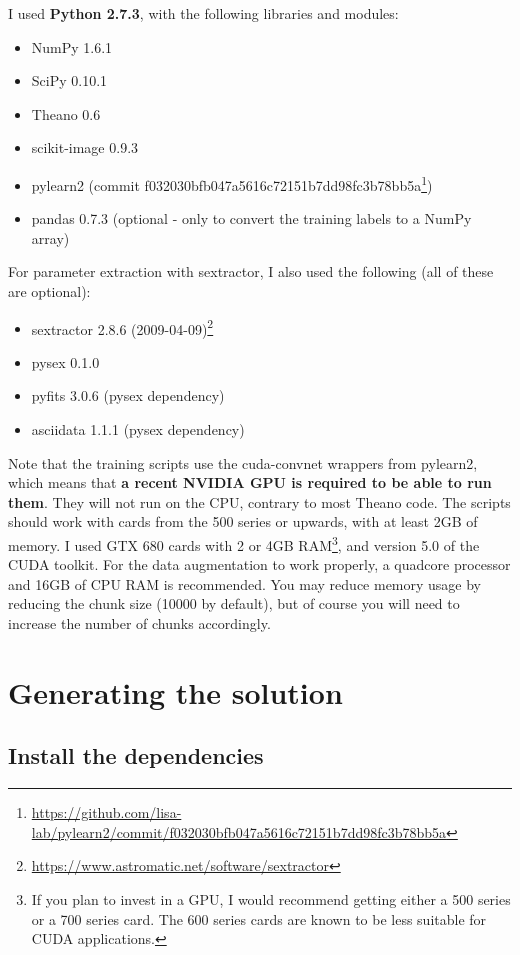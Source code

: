 \documentclass[a4paper,10pt]{article}
\begin{document}
I used \textbf{Python 2.7.3}, with the following libraries and modules:

\begin{itemize}
 \item NumPy 1.6.1
 \item SciPy 0.10.1
 \item Theano 0.6
 \item scikit-image 0.9.3
 \item pylearn2 (commit f032030bfb047a5616c72151b7dd98fc3b78bb5a\footnote{\url{https://github.com/lisa-lab/pylearn2/commit/f032030bfb047a5616c72151b7dd98fc3b78bb5a}})
 \item pandas 0.7.3 (optional - only to convert the training labels to a NumPy array)
\end{itemize}

For parameter extraction with sextractor, I also used the following (all of these are optional):
\begin{itemize}
 \item sextractor 2.8.6 (2009-04-09)\footnote{\url{https://www.astromatic.net/software/sextractor}}
 \item pysex 0.1.0
 \item pyfits 3.0.6 (pysex dependency)
 \item asciidata 1.1.1 (pysex dependency)
\end{itemize}

Note that the training scripts use the cuda-convnet wrappers from pylearn2, which means that \textbf{a recent NVIDIA GPU is required to be able to run them}. They will not run on the CPU, contrary to most Theano code. The scripts should work with cards from the 500 series or upwards, with at least 2GB of memory. I used GTX 680 cards with 2 or 4GB RAM\footnote{If you plan to invest in a GPU, I would recommend getting either a 500 series or a 700 series card. The 600 series cards are known to be less suitable for CUDA applications.}, and version 5.0 of the CUDA toolkit. For the data augmentation to work properly, a quadcore processor and 16GB of CPU RAM is recommended. You may reduce memory usage by reducing the chunk size (10000 by default), but of course you will need to increase the number of chunks accordingly.

\section{Generating the solution}
\label{sec:generating}

\subsection{Install the dependencies}
\end{document}
